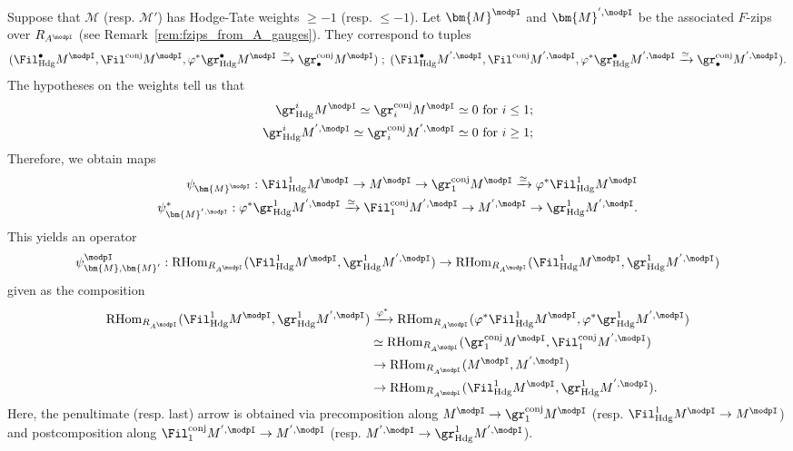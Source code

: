 \documentclass[10pt]{amsart}
\begin{document}
\begin{construction}
\label{const:operator_needs_to_be_nilpotent}
Suppose that $\mathcal{M}$ (resp. $\mathcal{M}'$) has Hodge-Tate weights $\ge -1$ (resp. $\leq -1$). Let $\bm{M}^\modpI$ and $\bm{M}^{',\modpI}$ be the associated $F$-zips over $R_{A^\modpI}$ (see Remark~\ref{rem:fzips_from_A_gauges}). They correspond to tuples
\[
(\Fil^\bullet_{\mathrm{Hdg}}M^\modpI,\Fil^{\mathrm{conj}}M^\modpI,\varphi^*\gr^\bullet_{\mathrm{Hdg}}M^\modpI\xrightarrow{\simeq}\gr^{\mathrm{conj}}_\bullet M^\modpI)\;;\; (\Fil^\bullet_{\mathrm{Hdg}}M^{',\modpI},\Fil^{\mathrm{conj}}M^{',\modpI},\varphi^*\gr^\bullet_{\mathrm{Hdg}}M^{',\modpI}\xrightarrow{\simeq}\gr^{\mathrm{conj}}_\bullet M^{',\modpI}).
\]
The hypotheses on the weights tell us that 
\begin{align*}
\gr^i_{\mathrm{Hdg}}M^\modpI \simeq \gr^{\mathrm{conj}}_iM^\modpI \simeq 0\text{ for $i\le 1$};\\
\gr^i_{\mathrm{Hdg}}M^{',\modpI} \simeq \gr^{\mathrm{conj}}_iM^{',\modpI} \simeq 0\text{ for $i\ge 1$};
\end{align*}
Therefore, we obtain maps
\begin{align*}
\psi_{\bm{M}^\modpI}:\Fil^1_{\mathrm{Hdg}}M^\modpI\to M^\modpI \to \gr^{\mathrm{conj}}_1M^\modpI\xrightarrow{\simeq}\varphi^*\Fil^1_{\mathrm{Hdg}}M^\modpI\\
\psi^*_{\bm{M}^{',\modpI}}:\varphi^*\gr^1_{\mathrm{Hdg}}M^{',\modpI}\xrightarrow{\simeq}\Fil^{\mathrm{conj}}_1M^{',\modpI}\to M^{',\modpI} \to \gr^1_{\mathrm{Hdg}}M^{',\modpI}.
\end{align*}
This yields an operator 
\[
\psi^\modpI_{\bm{M},\bm{M}'}: \mathrm{RHom}_{R_{A^\modpI}}(\Fil^1_{\mathrm{Hdg}}M^\modpI,\gr^{1}_{\mathrm{Hdg}}M^{',\modpI})\to \mathrm{RHom}_{R_{A^\modpI}}(\Fil^1_{\mathrm{Hdg}}M^\modpI,\gr^{1}_{\mathrm{Hdg}}M^{',\modpI})
\]
given as the composition
\begin{align*}
\mathrm{RHom}_{R_{A^\modpI}}(\Fil^1_{\mathrm{Hdg}}M^\modpI,\gr^{1}_{\mathrm{Hdg}}M^{',\modpI})&\xrightarrow{\varphi^*}\mathrm{RHom}_{R_{A^\modpI}}(\varphi^*\Fil^1_{\mathrm{Hdg}}M^\modpI,\varphi^*\gr^{1}_{\mathrm{Hdg}}M^{',\modpI})\\
&\simeq \mathrm{RHom}_{R_{A^\modpI}}(\gr^{\mathrm{conj}}_{1}M^\modpI,\Fil^{\mathrm{conj}}_{1}M^{',\modpI})\\
&\to  \mathrm{RHom}_{R_{A^\modpI}}(M^\modpI,M^{',\modpI})\\
&\to \mathrm{RHom}_{R_{A^\modpI}}(\Fil^1_{\mathrm{Hdg}}M^\modpI,\gr^{1}_{\mathrm{Hdg}}M^{',\modpI}).
\end{align*}
Here, the penultimate (resp. last) arrow is obtained via precomposition along $M^\modpI\to \gr^{\mathrm{conj}}_{1}M^\modpI$ (resp. $\Fil^1_{\mathrm{Hdg}}M^\modpI\to M^\modpI$) and postcomposition along $\Fil^{\mathrm{conj}}_1M^{',\modpI}\to M^{',\modpI}$ (resp. $M^{',\modpI}\to \gr^1_{\mathrm{Hdg}}M^{',\modpI}$).
\end{construction}
\end{document}
